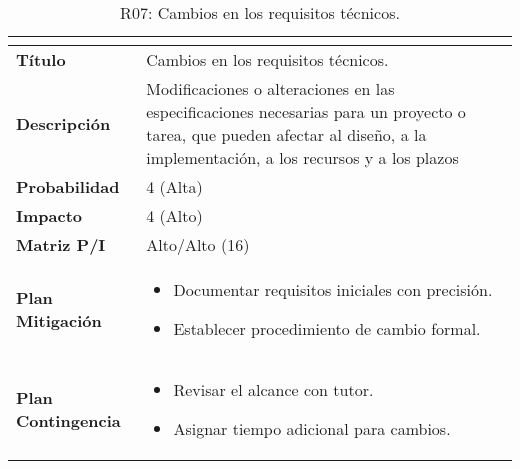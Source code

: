 \begin{table}[H]
\centering
\begin{tabular}{|>{\bfseries}l|p{10cm}|}
\hline
\rowcolor{lightgray}
\multicolumn{2}{|c|}{\textbf{Riesgo R07}} \\ \hline
Título & Cambios en los requisitos técnicos. \\ \hline
Descripción &  Modificaciones o alteraciones en las especificaciones necesarias para un proyecto o tarea, que pueden afectar al diseño, a la implementación, a los recursos y a los plazos \\ \hline
Probabilidad & 4 (Alta) \\ \hline
Impacto & 4 (Alto) \\ \hline
Matriz P/I & Alto/Alto (16)\\ \hline
Plan Mitigación & 
\begin{itemize}
\item Documentar requisitos iniciales con precisión.
\item Establecer procedimiento de cambio formal.
\end{itemize} \\ \hline
Plan Contingencia & 
\begin{itemize}
\item Revisar el alcance con tutor.
\item Asignar tiempo adicional para cambios.
\end{itemize} \\ \hline
\end{tabular}
\caption{R07: Cambios en los requisitos técnicos.}
\label{tab:R07}
\end{table}

